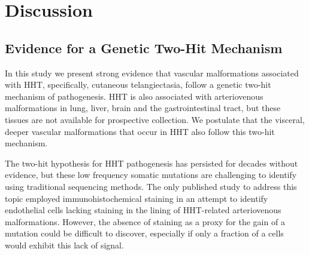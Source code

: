 \section{Discussion}
\subsection{Evidence for a Genetic Two-Hit Mechanism}
In this study we present strong evidence that vascular malformations associated with HHT, specifically, cutaneous telangiectasia, follow a genetic two-hit mechanism of pathogenesis. HHT is also associated with arteriovenous malformations in lung, liver, brain and the gastrointestinal tract, but these tissues are not available for prospective collection.  We postulate that the visceral, deeper vascular malformations that occur in HHT also follow this two-hit mechanism.  

The two-hit hypothesis for HHT pathogenesis has persisted for decades without evidence, but these low frequency somatic mutations are challenging to identify using traditional sequencing methods.  The only published study to address this topic employed immunohistochemical staining in an attempt to identify endothelial cells lacking staining in the lining of HHT-related arteriovenous malformations.\citep{bourdeau2000} However, the absence of staining as a proxy for the gain of a mutation could be difficult to discover, especially if only a fraction of a cells would exhibit this lack of signal.

